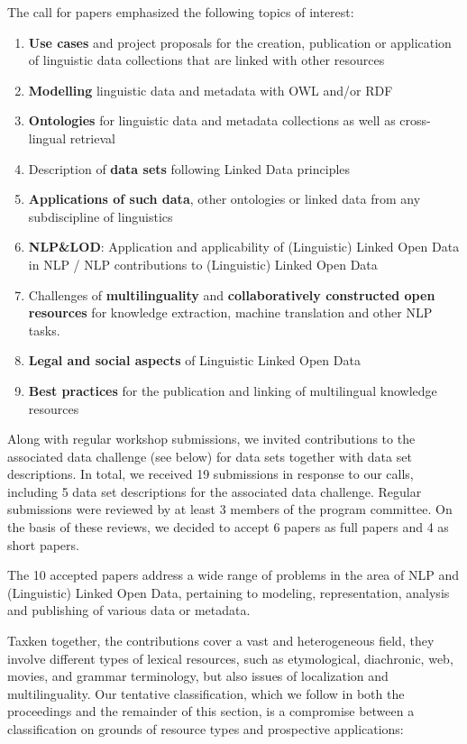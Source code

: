 The call for papers emphasized the following topics of interest:

\begin{enumerate}
\item \textbf{Use cases} and project proposals for the creation, publication or application of linguistic data collections that are linked with other resources
\item \textbf{Modelling} linguistic data and metadata with OWL and/or RDF
\item \textbf{Ontologies} for linguistic data and metadata collections as well as cross-lingual retrieval
\item Description of \textbf{data sets} following Linked Data principles
\item \textbf{Applications of such data}, other ontologies or linked data from any subdiscipline of linguistics %
\item \textbf{NLP\&LOD}: Application and applicability of (Linguistic) Linked Open Data in NLP / NLP contributions to (Linguistic) Linked Open Data
\item Challenges of \textbf{multilinguality} and \textbf{collaboratively constructed open resources} %
for knowledge extraction, machine translation and other NLP tasks.
\item \textbf{Legal and social aspects} of Linguistic Linked Open Data
\item \textbf{Best practices} for the publication and linking of multilingual knowledge resources
\end{enumerate}

\noindent 
Along with regular workshop submissions, we invited contributions to the associated data challenge (see below) for data sets together with data set descriptions.
In total, we received 19 submissions in response to our calls, including 5 data set descriptions for the associated data challenge. Regular submissions were reviewed by at least 3 
members of the program committee. 
On the basis of these reviews, we decided to accept 6 papers as full papers and 4 as short papers.

The 10 accepted papers address a wide range of problems in the area of NLP and (Linguistic) Linked Open Data, pertaining to modeling, representation, analysis and publishing of various 
data or metadata.

Taxken together, the contributions cover a vast and heterogeneous field, they involve different types of lexical resources, such as etymological, diachronic, web, movies, and grammar terminology, but also issues of localization and multilinguality. Our tentative classification, which we follow in both the proceedings and the remainder of this section, is a compromise between a classification on grounds of resource types and prospective applications:


